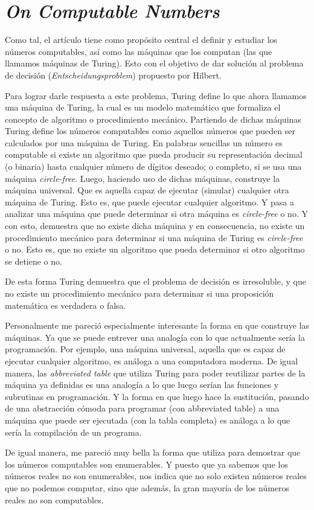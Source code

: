 \documentclass{article}
\begin{document}
    \maketitle
    \newpage
    
    \section*{\textit{On Computable Numbers}}

    Como tal, el artículo tiene como propósito central el definir y estudiar los números computables, así como las máquinas que los computan (las que llamamos máquinas de Turing). Esto con el objetivo de dar solución al problema de decisión (\textit{Entscheidungsproblem}) propuesto por Hilbert. 
    
    Para lograr darle respuesta a este problema, Turing define lo que ahora llamamos una máquina de Turing, la cual es un modelo matemático que formaliza el concepto de algoritmo o procedimiento mecánico. Partiendo de dichas máquinas Turing define los números computables como aquellos números que pueden ser calculados por una máquina de Turing. En palabras sencillas un número es computable si existe un algoritmo que pueda producir su representación decimal (o binaria) hasta cualquier número de dígitos deseado; o completo, si se usa una máquina \textit{circle-free}. Luego, haciendo uso de dichas máquinas, construye la máquina universal. Que es aquella capaz de ejecutar (simular) cualquier otra máquina de Turing. Esto es, que puede ejecutar cualquier algoritmo. Y pasa a analizar una máquina que puede determinar si otra máquina es \textit{circle-free} o no. Y con esto, demuestra que no existe dicha máquina y en consecuencia, no existe un procedimiento mecánico para determinar si una máquina de Turing es \textit{circle-free} o no. Esto es, que no existe un algoritmo que pueda determinar si otro algoritmo se detiene o no.

    De esta forma Turing demuestra que el problema de decisión es irresoluble, y que no existe un procedimiento mecánico para determinar si una proposición matemática es verdadera o falsa.

    Personalmente me pareció especialmente interesante la forma en que construye las máquinas. Ya que se puede entrever una analogía con lo que actualmente sería la programación. Por ejemplo, una máquina universal, aquella que es capaz de ejecutar cualquier algoritmo, es análoga a una computadora moderna. De igual manera, las \textit{abbreviated table} que utiliza Turing para poder reutilizar partes de la máquina ya definidas es una analogía a lo que luego serían las funciones y subrutinas en programación. Y la forma en que luego hace la sustitución, pasando de una abstracción cómoda para programar (con abbreviated table) a una máquina que puede ser ejecutada (con la tabla completa) es análoga a lo que sería la compilación de un programa.

    De igual manera, me pareció muy bella la forma que utiliza para demostrar que los números computables son enumerables. Y puesto que ya sabemos que los números reales no son enumerables, nos indica que no solo existen números reales que no podemos computar, sino que además, la gran mayoría de los números reales no son computables.
\end{document}

